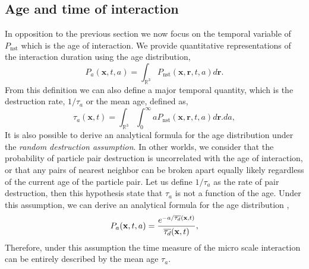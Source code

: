 \subsection{Age and time of interaction}

In opposition to the previous section we now focus on the temporal variable of $P_\text{nst}$ which is the age of interaction. 
We provide quantitative representations of the interaction duration using the age distribution,
\begin{equation*}
    P_a(\textbf{x},t,a)
    = \int_{\mathbb{R}^3}
    P_\text{nst}(\textbf{x},\textbf{r},t,a)
    d\textbf{r}. 
\end{equation*} 
From this definition we can also define a major temporal quantity, which is the destruction rate, $1/\tau_a$ or the mean age, defined as,  
\begin{equation}
    \tau_a(\textbf{x},t)
    = \int_{\mathbb{R}^3}
     \int_{0}^\infty
    a P_\text{nst}(\textbf{x},\textbf{r},t,a)
    d\textbf{r}. 
    da, 
    \label{eq:mean_time}
\end{equation} 
It is also possible to derive an analytical formula for the age distribution under the \textit{random destruction assumption}\citep{zhang2023evolution}.
In other worlds,  we consider that the probability of particle pair destruction is uncorrelated with the age of interaction, or that any pairs of nearest neighbor can be broken apart equally likely regardless of the current age of the particle pair. 
Let us define $1/\tau_a$ as the rate of pair destruction, then this hypothesis state that $\tau_a$ is not a function of the age.  
Under this assumption, we can derive an analytical formula for the age distribution \citep{zhang2023evolution}, 
\begin{align}
    P_a(\textbf{x},t, a)  
    =\frac{e^{-a/\overline{\tau_d}(\textbf{x},t)}}{\overline{\tau_d}(\textbf{x},t)},
    \label{eq:Pa}
\end{align} 
Therefore, under this assumption the time measure of the micro scale interaction can be entirely described by the mean age $\tau_a$. 

